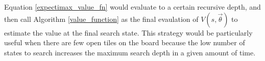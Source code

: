 \documentclass{article}
\begin{document}
Equation \ref{expectimax_value_fn} would evaluate to a certain recursive depth, and then call Algorithm \ref{value_function} as the final evaulation of $V(s, \vec{\theta})$ to estimate the value at the final search state.  This strategy would be particularly useful when there are few open tiles on the board because the low number of states to search increases the maximum search depth in a given amount of time.





\end{document}
